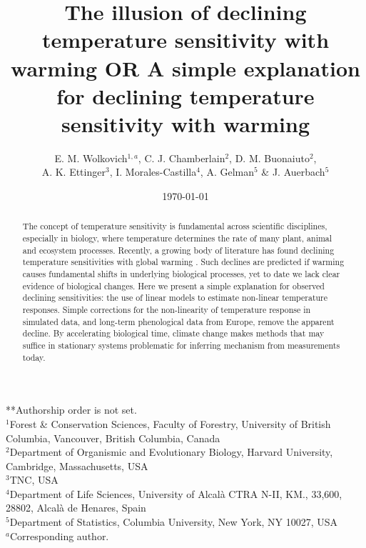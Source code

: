 \documentclass[11pt,letter]{article}
\begin{document}
\title{The illusion of declining temperature sensitivity with warming OR A simple explanation for declining temperature sensitivity with warming} %
\author{E. M. Wolkovich$^{1,a}$, C. J. Chamberlain$^{2}$, D. M. Buonaiuto$^{2}$, \\ A. K. Ettinger$^3$, I. Morales-Castilla$^{4}$, A. Gelman$^{5}$ \& J. Auerbach$^{5}$} %

\date{\today} 
\maketitle
**Authorship order is not set.\\
$^1$Forest \& Conservation Sciences, Faculty of Forestry, University of British Columbia, Vancouver, British Columbia, Canada\\
$^2$Department of Organismic and Evolutionary Biology, Harvard University, Cambridge, Massachusetts, USA\\
$^3$TNC, USA\\
$^4$Department of Life Sciences, University of Alcal\`a CTRA N-II, KM., 33,600, 28802, Alcal\`a de Henares, Spain\\
$^5$Department of Statistics, Columbia University, New York, NY 10027, USA\\
$^a$Corresponding author.


\begin{abstract} %
The concept of temperature sensitivity is fundamental across scientific disciplines, especially in biology, where temperature determines the rate of many plant, animal and ecosystem processes. Recently, a growing body of literature has found declining temperature sensitivities with global warming \citep{fu2015,gusewell2017,piao2017,dai2019ag}. Such declines are predicted if warming causes fundamental shifts in underlying biological processes, yet to date we lack clear evidence of biological changes. Here we present a simple explanation for observed declining sensitivities: the use of linear models to estimate non-linear temperature responses. Simple corrections for the non-linearity of temperature response in simulated data, and long-term phenological data from Europe, remove the apparent decline. By accelerating biological time, climate change makes methods that may suffice in stationary systems problematic for inferring mechanism from measurements today. 
\end{abstract}
\end{document}
